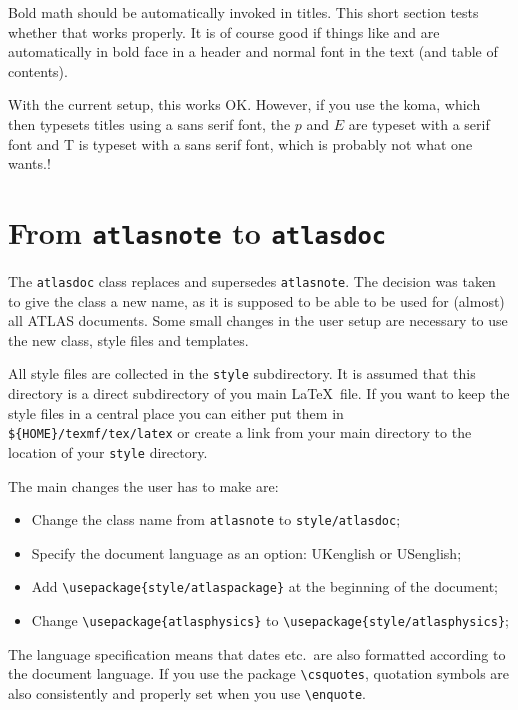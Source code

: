 \documentclass[koma,UKenglish]{style/atlasdoc}
\newcommand{\Macro}[1]{\texttt{\textbackslash #1}\xspace}
\newcommand{\Option}[1]{\textsf{#1}\xspace}
\begin{document}
Bold math should be automatically invoked in titles.
This short section tests whether that works properly.
It is of course good if things like \pT and \ET are automatically in bold face in
a header and normal font in the text (and table of contents).

With the current setup, this works OK. 
However, if you use the \Option{koma}, which then typesets titles using a sans serif font,
the $p$ and $E$ are typeset with a serif font and \textsf{T} is typeset with a sans serif font,
which is probably not what one wants.!


\section{From \texttt{atlasnote} to \texttt{atlasdoc}}
\label{sec:oldnote}

The \texttt{atlasdoc} class replaces and supersedes \texttt{atlasnote}.
The decision was taken to give the class a new name, as it is supposed to be
able to be used for (almost) all ATLAS documents.
Some small changes in the user setup are necessary to use the new
class, style files and templates.

All style files are collected in the \texttt{style} subdirectory.
It is assumed that this directory is a direct subdirectory of you main \LaTeX\ file.
If you want to keep the style files in a central place you can either put them in
\verb|${HOME}/texmf/tex/latex| or create a link from your main directory to the location of
your \texttt{style} directory.

The main changes the user has to make are:
\begin{itemize}
\item Change the class name from \texttt{atlasnote} to \texttt{style/atlasdoc};
\item Specify the document language as an option: UKenglish or USenglish;
\item Add \verb|\usepackage{style/atlaspackage}| at the beginning of the document;
\item Change \verb|\usepackage{atlasphysics}| to \verb|\usepackage{style/atlasphysics}|; 
\end{itemize}

The language specification means that dates etc.\ are also formatted according to 
the document language. 
If you use the package \Macro{csquotes}, quotation symbols are also consistently and properly set
when you use \Macro{enquote}.
\end{document}
